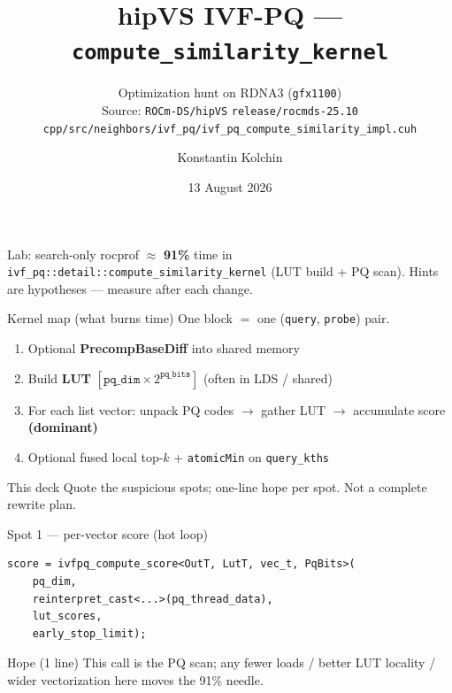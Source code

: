 \documentclass[aspectratio=169,10pt]{beamer}
\title{hipVS IVF-PQ --- \texttt{compute\_similarity\_kernel}}
\subtitle{Optimization hunt on RDNA3 (\texttt{gfx1100}) \\
\small Source: \texttt{ROCm-DS/hipVS} \texttt{release/rocmds-25.10} \\
\texttt{cpp/src/neighbors/ivf\_pq/ivf\_pq\_compute\_similarity\_impl.cuh}}
\author{Konstantin Kolchin}
\date{13 August 2026}
\begin{document}
\begin{frame}
  \titlepage
  \vspace{0.2em}
  \begin{center}
    \footnotesize
    Lab: search-only rocprof $\approx$ \textbf{91\%} time in
    \texttt{ivf\_pq::detail::compute\_similarity\_kernel}
    (LUT build + PQ scan). Hints are hypotheses --- measure after each change.
  \end{center}
\end{frame}

\begin{frame}{Kernel map (what burns time)}
  \footnotesize
  One block $=$ one (\texttt{query}, \texttt{probe}) pair.
  \begin{enumerate}
    \item Optional \textbf{PrecompBaseDiff} into shared memory
    \item Build \textbf{LUT} $[\texttt{pq\_dim}\times 2^{\texttt{pq\_bits}}]$
          (often in LDS / shared)
    \item For each list vector: unpack PQ codes $\rightarrow$ gather LUT
          $\rightarrow$ accumulate score \quad\textbf{(dominant)}
    \item Optional fused local top-$k$ + \texttt{atomicMin} on
          \texttt{query\_kths}
  \end{enumerate}
  \vspace{0.4em}
  \begin{block}{This deck}
    Quote the suspicious spots; one-line hope per spot.
    Not a complete rewrite plan.
  \end{block}
\end{frame}

\begin{frame}[fragile]{Spot 1 --- per-vector score (hot loop)}
\begin{lstlisting}
score = ivfpq_compute_score<OutT, LutT, vec_t, PqBits>(
    pq_dim,
    reinterpret_cast<...>(pq_thread_data),
    lut_scores,
    early_stop_limit);
\end{lstlisting}
  \vspace{0.3em}
  \begin{alertblock}{Hope (1 line)}
    This call is the PQ scan; any fewer loads / better LUT locality /
    wider vectorization here moves the 91\% needle.
  \end{alertblock}
\end{frame}
\end{document}
